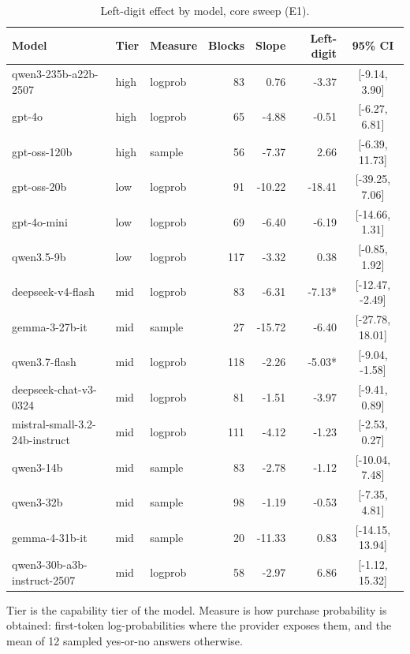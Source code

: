 \begin{table}[t]
\centering
\caption{Left-digit effect by model, core sweep (E1).}
\label{tab:bymodel}
\small
\begin{tabular}{lllrrrc}
\toprule
Model & Tier & Measure & Blocks & Slope & Left-digit & 95\% CI \\
\midrule
qwen3-235b-a22b-2507 & high & logprob &  83 & 0.76 & -3.37 & [-9.14, 3.90] \\
gpt-4o & high & logprob &  65 & -4.88 & -0.51 & [-6.27, 6.81] \\
gpt-oss-120b & high & sample &  56 & -7.37 & 2.66 & [-6.39, 11.73] \\
gpt-oss-20b & low & logprob &  91 & -10.22 & -18.41 & [-39.25, 7.06] \\
gpt-4o-mini & low & logprob &  69 & -6.40 & -6.19 & [-14.66, 1.31] \\
qwen3.5-9b & low & logprob & 117 & -3.32 & 0.38 & [-0.85, 1.92] \\
deepseek-v4-flash & mid & logprob &  83 & -6.31 & -7.13* & [-12.47, -2.49] \\
gemma-3-27b-it & mid & sample &  27 & -15.72 & -6.40 & [-27.78, 18.01] \\
qwen3.7-flash & mid & logprob & 118 & -2.26 & -5.03* & [-9.04, -1.58] \\
deepseek-chat-v3-0324 & mid & logprob &  81 & -1.51 & -3.97 & [-9.41, 0.89] \\
mistral-small-3.2-24b-instruct & mid & logprob & 111 & -4.12 & -1.23 & [-2.53, 0.27] \\
qwen3-14b & mid & sample &  83 & -2.78 & -1.12 & [-10.04, 7.48] \\
qwen3-32b & mid & sample &  98 & -1.19 & -0.53 & [-7.35, 4.81] \\
gemma-4-31b-it & mid & sample &  20 & -11.33 & 0.83 & [-14.15, 13.94] \\
qwen3-30b-a3b-instruct-2507 & mid & logprob &  58 & -2.97 & 6.86 & [-1.12, 15.32] \\
\bottomrule
\end{tabular}
\vspace{2pt}
\parbox{\linewidth}{\footnotesize Tier is the capability tier of the model. Measure is how purchase probability is obtained: first-token log-probabilities where the provider exposes them, and the mean of 12 sampled yes-or-no answers otherwise.}
\end{table}
